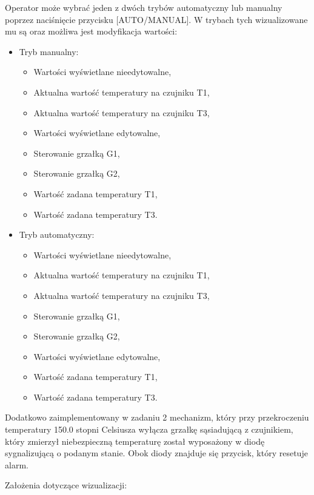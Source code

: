 Operator może wybrać jeden z dwóch trybów automatyczny lub manualny poprzez naciśnięcie przycisku [AUTO/MANUAL].
W trybach tych wizualizowane mu są oraz możliwa jest modyfikacja wartości:
\begin{itemize}
    \item 
    Tryb manualny:
    \begin{itemize}
        \item Wartości wyświetlane nieedytowalne,
        \item Aktualna wartość temperatury na czujniku T1,
        \item Aktualna wartość temperatury na czujniku T3,
        \item Wartości wyświetlane edytowalne,
        \item Sterowanie grzałką G1,
        \item Sterowanie grzałką G2,
        \item Wartość zadana temperatury T1,
        \item Wartość zadana temperatury T3.
    \end{itemize}
    \item
    Tryb automatyczny:
    \begin{itemize}
        \item Wartości wyświetlane nieedytowalne,
        \item Aktualna wartość temperatury na czujniku T1,
        \item Aktualna wartość temperatury na czujniku T3,
        \item Sterowanie grzałką G1,
        \item Sterowanie grzałką G2,
        \item Wartości wyświetlane edytowalne,
        \item Wartość zadana temperatury T1,
        \item Wartość zadana temperatury T3.
    \end{itemize}
\end{itemize}


Dodatkowo zaimplementowany w zadaniu 2 mechanizm, 
który przy przekroczeniu temperatury \num{150.0} stopni Celsiusza wyłącza grzałkę sąsiadującą z czujnikiem, 
który zmierzył niebezpieczną temperaturę został wyposażony w diodę sygnalizującą o podanym stanie. 
Obok diody znajduje się przycisk, który resetuje alarm.

Założenia dotyczące wizualizacji:


